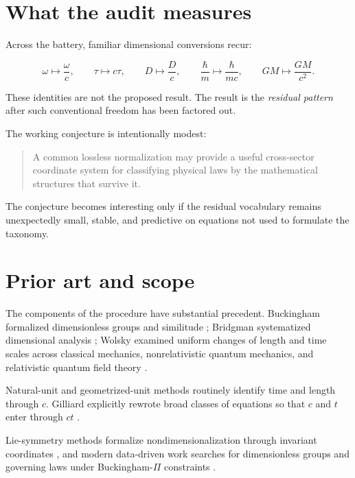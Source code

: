 \documentclass[10pt]{article}
\begin{document}
\section{What the audit measures}

Across the battery, familiar dimensional conversions recur:

\begin{equation}
  \omega\mapsto\frac{\omega}{c},
  \qquad
  \tau\mapsto c\tau,
  \qquad
  D\mapsto\frac{D}{c},
  \qquad
  \frac{\hbar}{m}\mapsto\frac{\hbar}{mc},
  \qquad
  GM\mapsto\frac{GM}{c^2}.
\end{equation}

These identities are not the proposed result. The result is the
\emph{residual pattern} after such conventional freedom has been
factored out.

The working conjecture is intentionally modest:

\begin{quote}
A common lossless normalization may provide a useful cross-sector
coordinate system for classifying physical laws by the mathematical
structures that survive it.
\end{quote}

The conjecture becomes interesting only if the residual vocabulary
remains unexpectedly small, stable, and predictive on equations not
used to formulate the taxonomy.

\section{Prior art and scope}

The components of the procedure have substantial precedent.
Buckingham formalized dimensionless groups and similitude
\cite{Buckingham1914}; Bridgman systematized dimensional analysis
\cite{Bridgman1922}; Wolsky examined uniform changes of length and
time scales across classical mechanics, nonrelativistic quantum
mechanics, and relativistic quantum field theory
\cite{Wolsky1971}.

Natural-unit and geometrized-unit methods routinely identify time and
length through \(c\). Gilliard explicitly rewrote broad classes of
equations so that \(c\) and \(t\) enter through \(ct\)
\cite{Gilliard2020}.

Lie-symmetry methods formalize nondimensionalization through
invariant coordinates \cite{Hubert2006}, and modern data-driven work
searches for dimensionless groups and governing laws under
Buckingham-\(\Pi\) constraints \cite{Bakarji2022,Xie2022}.
\end{document}
